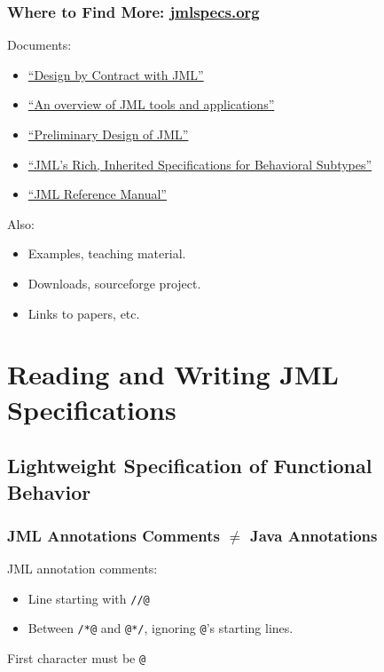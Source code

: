 \begin{frame}
\frametitle{Where to Find More: \href{http://www.jmlspecs.org}{jmlspecs.org}}

Documents:
\begin{itemize}
\item
\href{ftp://ftp.cs.iastate.edu/pub/leavens/JML/jmldbc.pdf}{``Design by Contract with JML''}

\item
\href{http://dx.doi.org/10.1007/s10009-004-0167-4}{``An overview of JML tools and applications''}

\item
\href{http://doi.acm.org/10.1145/1127878.1127884}{``Preliminary Design of JML''}

\item
\href{http://dx.doi.org/10.1007/11901433}{``JML's Rich, Inherited Specifications for Behavioral Subtypes''}

\item
\href{http://www.jmlspecs.org/jmlrefman/jmlrefman_toc.html}{``JML Reference Manual''}
\end{itemize}

Also:
\begin{itemize}
\item
Examples, teaching material.

\item
Downloads, sourceforge project.

\item
Links to papers, etc.
\end{itemize}

\end{frame}

\section[R/W]{Reading and Writing JML Specifications}

\subsection[Lightweight]{Lightweight Specification of Functional Behavior}

\begin{frame}[fragile]
\frametitle{JML Annotations Comments $\neq$ Java Annotations}

JML annotation comments:
\begin{itemize}
\item
Line starting with \lstinline!//@!

\item
Between \lstinline!/*@! and \lstinline!@*/!,
ignoring \lstinline!@!'s starting lines.
\end{itemize}

First character must be \lstinline!@!

\end{frame}

